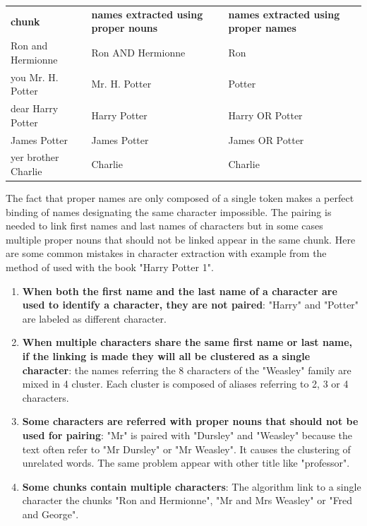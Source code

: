 \documentclass[a4paper, 12pt]{report}
\begin{document}
 \begin{tabular}{lll}
\textbf{chunk} & \textbf{names extracted using proper nouns} &  \textbf{names extracted using proper names} \\
   Ron and Hermionne & Ron AND Hermionne & Ron\\
   you Mr. H. Potter & Mr. H. Potter &  Potter\\
   dear Harry Potter & Harry Potter & Harry OR Potter \\
   James Potter& James Potter & James OR Potter \\
   yer brother Charlie & Charlie & Charlie\\
\end{tabular}


 The fact that proper names are only composed of a single token makes a perfect binding of names designating the same character impossible. The pairing is needed to link first names and last names of characters but in some cases multiple proper nouns that should not be linked appear in the same chunk. Here are some common mistakes in character extraction with example from the method of \cite{original} used with the book "Harry Potter 1".
\begin{enumerate}
    \item \textbf{When both the first name and the last name of a character are used to identify a character, they are not paired}: "Harry" and "Potter" are labeled as different character.
    
    \item \textbf{When multiple characters share the same first name or last name, if the linking is made they will all be clustered as a single character}: the names referring the 8 characters of the "Weasley" family are mixed in 4 cluster. Each cluster is composed of aliases referring to 2, 3 or 4 characters.
    
    \item \textbf{Some characters are referred with proper nouns that should not be used for pairing}: "Mr" is paired with "Dursley" and "Weasley" because the text often refer to "Mr Dursley" or "Mr Weasley". It causes the clustering of unrelated words. The same problem appear with other title like "professor". 
    
    \item \textbf{Some chunks contain multiple characters}: The algorithm link to a single character the chunks "Ron and Hermionne", "Mr and Mrs Weasley" or "Fred and George".
\end{enumerate}
\end{document}
